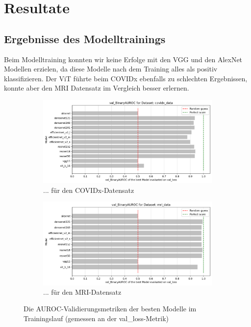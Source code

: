 \section{Resultate}




\subsection{Ergebnisse des Modelltrainings} \label{chap:ergebnisse-modelltraining}

Beim Modelltraining konnten wir keine Erfolge mit den VGG und den AlexNet Modellen erzielen, da diese Modelle nach dem Training alles als positiv klassifizieren. Der ViT führte beim COVIDx ebenfalls zu schlechten Ergebnissen, konnte aber den MRI Datensatz im Vergleich besser erlernen.

\begin{figure}[ht!]
    \centering
    \begin{subfigure}{0.5\linewidth}
        \centering
        \includegraphics[height=0.5\linewidth]{01-images/05-resultate/val_binaryAUROC_COVIDX.png}
        \caption{...  für den COVIDx-Datensatz}
    \end{subfigure}\hfill%
    \begin{subfigure}{0.5\linewidth}
        \centering
        \includegraphics[height=0.5\linewidth]{01-images/05-resultate/val_binaryAUROC_MRI.png}
        \caption{... für den MRI-Datensatz}
    \end{subfigure}
    \caption{Die AUROC-Validierungsmetriken der besten Modelle im Trainingslauf (gemessen an der val\_loss-Metrik)}
\end{figure}

